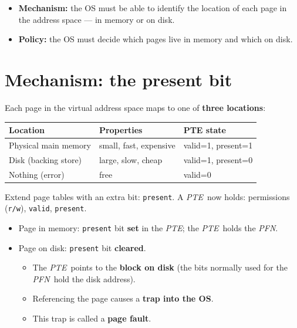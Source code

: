 \documentclass[11pt,a4paper]{article}
\newcommand{\pfn}{\textit{PFN}}
\newcommand{\pte}{\textit{PTE}}
\begin{document}
\begin{keybox}[Requirements]
\begin{itemize}
  \item \textbf{Mechanism:} the OS must be able to identify the location
        of each page in the address space --- in memory or on disk.
  \item \textbf{Policy:} the OS must decide which pages live in memory and
        which on disk.
\end{itemize}
\end{keybox}

\section{Mechanism: the present bit}

Each page in the virtual address space maps to one of
\textbf{three locations}:

\begin{center}
\renewcommand{\arraystretch}{1.15}
\begin{tabular}{@{}lll@{}}
  \toprule
  \textbf{Location} & \textbf{Properties} & \textbf{PTE state} \\
  \midrule
  Physical main memory & small, fast, expensive & valid=1, present=1 \\
  Disk (backing store) & large, slow, cheap     & valid=1, present=0 \\
  Nothing (error)      & free                   & valid=0 \\
  \bottomrule
\end{tabular}
\end{center}

Extend page tables with an extra bit: \texttt{present}.
A \pte\ now holds: permissions (\texttt{r/w}), \texttt{valid}, \texttt{present}.
\begin{itemize}
  \item Page in memory: \texttt{present} bit \textbf{set} in the \pte;
        the \pte\ holds the \pfn.
  \item Page on disk: \texttt{present} bit \textbf{cleared}.
        \begin{itemize}
          \item The \pte\ points to the \textbf{block on disk}
                (the bits normally used for the \pfn\ hold the disk address).
          \item Referencing the page causes a \textbf{trap into the OS}.
          \item This trap is called a \textbf{page fault}.
        \end{itemize}
\end{itemize}
\end{document}
